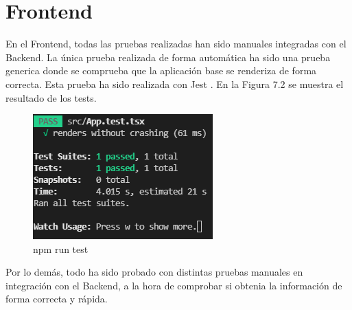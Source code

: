 \section{Frontend}
En el Frontend, todas las pruebas realizadas han sido manuales integradas con el Backend. La única prueba realizada de forma automática ha sido una prueba generica donde se comprueba que la aplicación base se renderiza de forma correcta. Esta prueba ha sido realizada con Jest \cite{jest}. En la Figura 7.2 se muestra el resultado de los tests.

\begin{figure}[H]
    \centering
    \includegraphics[width=0.7\linewidth]{images/test/test app frontend.png}
    \caption{npm run test}
\end{figure}

Por lo demás, todo ha sido probado con distintas pruebas manuales en integración con el Backend, a la hora de comprobar si obtenia la información de forma correcta y rápida.